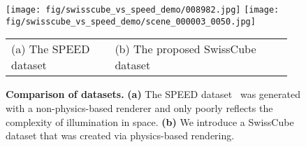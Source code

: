 

\begin{figure}[t]
\begin{minipage}{\linewidth}
\centering
\texttt{[image: fig/swisscube\_vs\_speed\_demo/008982.jpg]}
\hspace{1em}
\texttt{[image: fig/swisscube\_vs\_speed\_demo/scene\_000003\_0050.jpg]}
\begin{scriptsize}
\begin{tabular}{C{0.35\linewidth}C{0.6\linewidth}}
(a) The SPEED dataset & (b) The proposed SwissCube dataset
\end{tabular}
\end{scriptsize}

\vspace{-6mm}
\caption{\small {\bf Comparison of datasets.} {\bf (a)} The SPEED dataset~\cite{Kisantal20} was generated with a non-physics-based renderer and only poorly reflects the complexity of illumination in space. {\bf (b)} We introduce a SwissCube dataset that was created via physics-based rendering. 
}
\label{fig:swisscube_vs_speed_demo}
\end{minipage}
\end{figure}